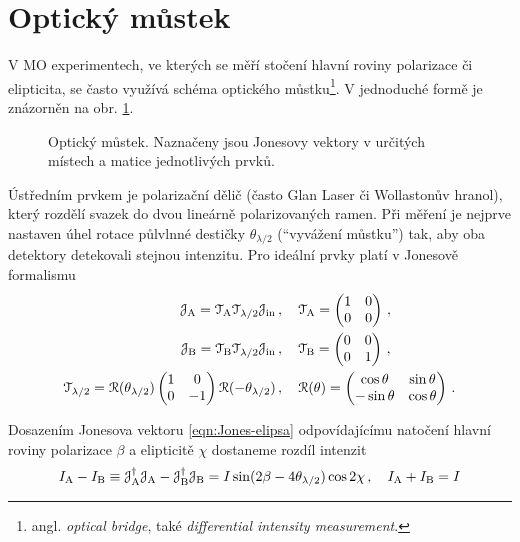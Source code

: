 \section{Optický můstek}
\label{chap:mustek-kap2}
V MO experimentech, ve kterých se měří stočení hlavní roviny polarizace či elipticita, se často využívá schéma optického můstku\footnote{angl. \emph{optical bridge}, také \emph{differential intensity measurement}.}\cite{silberQuadraticMagnetoopticKerr2019a}.
V jednoduché formě je znázorněn na obr. \ref{fig:mustek-schema}.

\begin{figure}[htbp]
    \centering
    
    \caption{Optický můstek. Naznačeny jsou Jonesovy vektory v určitých místech a matice jednotlivých prvků.}
    \label{fig:mustek-schema}
\end{figure}

Ústředním prvkem je polarizační dělič (často Glan Laser či Wollastonův hranol), který rozdělí svazek do dvou lineárně polarizovaných ramen.
Při měření je nejprve nastaven úhel rotace půlvlnné destičky $\theta_{\lambda/2}$ (``vyvážení můstku'') tak, aby oba detektory detekovali stejnou intenzitu.
Pro ideální prvky platí v Jonesově formalismu
\begin{align}
    \mathcal{J}_\textrm{A} = \mathcal{T}_\textrm{A} \mathcal{T}_{\lambda/2} \mathcal{J}_\textrm{in} \,&, \quad 
    \mathcal{T}_\textrm{A}=\begin{pmatrix} 1&0\\0&0 \end{pmatrix} \,, \\
    \mathcal{J}_\textrm{B} = \mathcal{T}_\textrm{B} \mathcal{T}_{\lambda/2} \mathcal{J}_\textrm{in} \,&, \quad
    \mathcal{T}_\textrm{B}=\begin{pmatrix} 0&0\\0&1 \end{pmatrix} \,,\\
    \mathcal{T}_{\lambda/2}=\mathcal{R}(\theta_{\lambda/2})\begin{pmatrix} 1&0\\0&-1 \end{pmatrix}\mathcal{R}(-\theta_{\lambda/2}) \,&, \quad
    \mathcal{R}(\theta)=\begin{pmatrix} \cos\theta&\sin\theta\\-\sin\theta&\cos\theta \end{pmatrix} \,.
\end{align}

Dosazením Jonesova vektoru \eqref{eqn:Jones-elipsa} odpovídajícímu natočení hlavní roviny polarizace $\beta$ a elipticitě $\chi$ dostaneme rozdíl intenzit
\begin{equation}
    I_\textrm{A}-I_\textrm{B}\equiv\mathcal{J}_\textrm{A}^\dagger\mathcal{J}_\textrm{A}-\mathcal{J}_\textrm{B}^\dagger\mathcal{J}_\textrm{B}=I\sin(2\beta-4\theta_{\lambda/2})\cos2\chi \,, \quad I_\textrm{A}+I_\textrm{B}=I
\end{equation}

